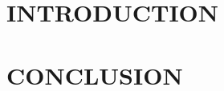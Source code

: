 \documentclass[a4paper, 14pt]{article}
\begin{document}
{\newpage
\tableofcontents
\listoffigures
\listoftables

\newpage
{}
\section{INTRODUCTION}

\newpage
\section{CONCLUSION}
}
\end{document}
